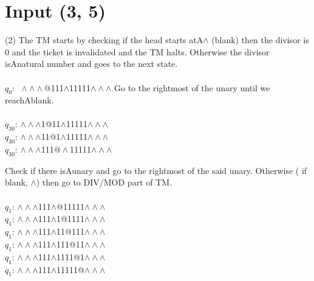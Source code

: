 \documentclass[a4paper]{article} %
\begin{document}
    \section{Input (3, 5)}
        \begin{tasks}[label={(\roman*)},label-width={0.7cm},before-skip = -\parskip , %
            after-skip = -\parskip,
            after-item-skip = -\parskip] (2)
            \task
            The TM starts by checking if the head starts atA$\land$ (blank) then the divisor is 0 and the ticket is invalidated and the TM halts.
            Otherwise the divisor isAnatural number and goes to the next state.\\\\
            $q_0$: $\;\land\land\land$@111$\land$11111$\land\land\land$
            \task
            Go to the rightmost of the unary until we reachAblank.\\\\
            $q_{30}$: $\land\land\land$1@11$\land$11111$\land\land\land$\\
            $q_{30}$: $\land\land\land$11@1$\land$11111$\land\land\land$\\
            $q_{30}$: $\land\land\land$111$@\land$11111$\land\land\land$ 

            \task
            Check if there isAunary and go to the rightmost of the said unary. Otherwise ( if blank, $\land$) then go to DIV/MOD part of TM.\\\\
            $q_1$: $\land\land\land$111$\land$@11111$\land\land\land$\\
            $q_1$: $\land\land\land$111$\land$1@1111$\land\land\land$\\
            $q_1$: $\land\land\land$111$\land$11@111$\land\land\land$\\
            $q_1$: $\land\land\land$111$\land$111@11$\land\land\land$\\
            $q_1$: $\land\land\land$111$\land$1111@1$\land\land\land$\\
            $q_1$: $\land\land\land$111$\land$11111@$\land\land\land$


\end{tasks}
\end{document}
